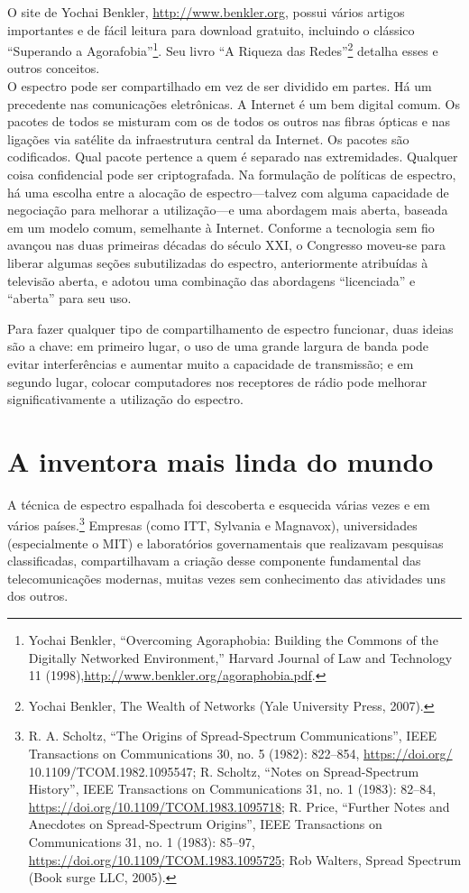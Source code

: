 \documentclass{book}
\begin{document}
O site de Yochai Benkler, \url{http://www.benkler.org}, possui vários artigos
importantes e de fácil leitura para download gratuito, incluindo o clássico
``Superando a Agorafobia''\footnote{Yochai Benkler, ``Overcoming Agoraphobia:
Building the Commons of the Digitally Networked Environment,'' Harvard Journal
of Law and Technology 11 (1998),\url{http://www.benkler.org/agoraphobia.pdf}.}. 
Seu livro ``A Riqueza das Redes''\footnote{Yochai Benkler, The Wealth of Networks
(Yale University Press, 2007).} detalha esses e outros conceitos.\\

O espectro pode ser compartilhado em vez de ser dividido em partes. Há um
precedente nas comunicações eletrônicas. A Internet é um bem digital comum. Os
pacotes de todos se misturam com os de todos os outros nas fibras ópticas e nas
ligações via satélite da infraestrutura central da Internet. Os pacotes são
codificados. Qual pacote pertence a quem é separado nas extremidades. Qualquer
coisa confidencial pode ser criptografada. Na formulação de políticas de espectro,
há uma escolha entre a alocação de espectro---talvez com alguma capacidade de
negociação para melhorar a utilização---e uma abordagem mais aberta, baseada em
um modelo comum, semelhante à Internet. Conforme a tecnologia sem fio avançou
nas duas primeiras décadas do século XXI, o Congresso moveu-se para liberar
algumas seções subutilizadas do espectro, anteriormente atribuídas à televisão
aberta, e adotou uma combinação das abordagens ``licenciada'' e ``aberta'' para
seu uso.

Para fazer qualquer tipo de compartilhamento de espectro funcionar, duas ideias
são a chave: em primeiro lugar, o uso de uma grande largura de banda pode
evitar interferências e aumentar muito a capacidade de transmissão; e em segundo
lugar, colocar computadores nos receptores de rádio pode melhorar
significativamente a utilização do espectro.

\section{A inventora mais linda do mundo}
\label{cap8:os-inventora}
A técnica de espectro espalhada foi descoberta e esquecida várias vezes e em
vários países.\footnote{R. A. Scholtz, ``The Origins of Spread-Spectrum
Communications'', IEEE Transactions on Communications 30, no. 5 (1982): 822--854,
\url{https://doi.org/} 10.1109/TCOM.1982.1095547; R. Scholtz, ``Notes on 
Spread-Spectrum History'', IEEE Transactions on Communications 31, no. 1 (1983):
82--84, \url{https://doi.org/10.1109/TCOM.1983.1095718}; R. Price, ``Further
Notes and Anecdotes on Spread-Spectrum Origins'', IEEE Transactions on
Communications 31, no. 1 (1983): 85--97,
\url{https://doi.org/10.1109/TCOM.1983.1095725}; Rob Walters, Spread Spectrum
(Book surge LLC, 2005).} Empresas (como ITT, Sylvania e Magnavox), universidades
(especialmente o MIT) e laboratórios governamentais que realizavam pesquisas
classificadas, compartilhavam a criação desse componente fundamental das
telecomunicações modernas, muitas vezes sem conhecimento das atividades uns dos
outros.
\end{document}

